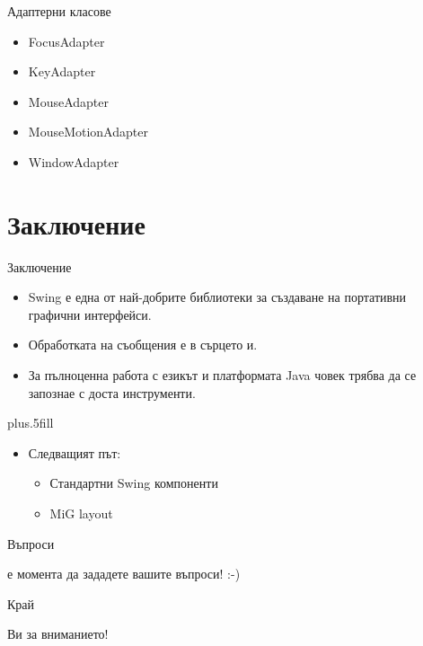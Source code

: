 \documentclass{beamer}
\begin{document}
\begin{frame}{Адаптерни класове}
  \transdissolve
  \begin{itemize}
  \item FocusAdapter
  \item KeyAdapter
  \item MouseAdapter
  \item MouseMotionAdapter
  \item WindowAdapter
  \end{itemize}
\end{frame}

\section*{Заключение}

\begin{frame}{Заключение}
  \transdissolve
  \begin{itemize}
  \item
    Swing е една от най-добрите библиотеки за създаване на портативни
    графични интерфейси.
  \item
    Обработката на съобщения е в сърцето и.
  \item
    За пълноценна работа с езикът и платформата Java човек трябва да
    се запознае с доста инструменти.
  \end{itemize}
  
  \vskip0pt plus.5fill
  \begin{itemize}
  \item
    Следващият път:
    \begin{itemize}
    \item
      Стандартни Swing компоненти
    \item
      MiG layout
    \end{itemize}
  \end{itemize}
\end{frame}

\begin{frame}{Въпроси}
  \transdissolve
  \begin{center}
     е момента да зададете вашите въпроси! :-)
  \end{center}
\end{frame}

\begin{frame}{Край}
  \transdissolve
  \begin{center}
     Ви за вниманието!
  \end{center}
\end{frame}
\end{document}
